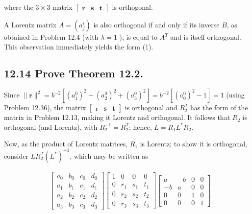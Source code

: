 \documentclass[10pt]{article}
\begin{document}
where the $3 \times 3$ matrix $\left[\begin{array}{lll}\mathbf{r} & \mathbf{s} & \mathbf{t}\end{array}\right]$ is orthogonal.

A Lorentz matrix $A=\left(a_{j}^{i}\right)$ is also orthogonal if and only if its inverse $B$, as obtained in Problem 12.4 (with $\lambda=1$ ), is equal to $A^{T}$ and is itself orthogonal. This observation immediately yields the form (1).

\subsection*{12.14 Prove Theorem 12.2.}
Since $\|\mathbf{r}\|^{2}=b^{-2}\left[\left(a_{1}^{0}\right)^{2}+\left(a_{2}^{0}\right)^{2}+\left(a_{3}^{0}\right)^{2}\right]=b^{-2}\left[\left(a_{0}^{0}\right)^{2}-1\right]=1$ (using Problem 12.36), the matrix $\left[\begin{array}{lll}\mathrm{r} & \mathbf{s} & \mathbf{t}\end{array}\right]$ is orthogonal and $R_{2}^{T}$ has the form of the matrix in Problem 12.13, making it Lorentz and orthogonal. It follows that $R_{2}$ is orthogonal (and Lorentz), with $R_{2}^{-1}=R_{2}^{T}$; hence, $L=R_{1} L^{*} R_{2}$.

Now, as the product of Lorentz matrices, $R_{1}$ is Lorentz; to show it is orthogonal, consider $L R_{2}^{T}\left(L^{*}\right)^{-1}$, which may be written as

$$
\begin{aligned}
& {\left[\begin{array}{llll}
a_{0} & b_{0} & c_{0} & d_{0} \\
a_{1} & b_{1} & c_{1} & d_{1} \\
a_{2} & b_{2} & c_{2} & d_{2} \\
a_{3} & b_{3} & c_{3} & d_{3}
\end{array}\right]\left[\begin{array}{llll}
1 & 0 & 0 & 0 \\
0 & r_{1} & s_{1} & t_{1} \\
0 & r_{2} & s_{2} & t_{2} \\
0 & r_{3} & s_{3} & t_{3}
\end{array}\right]\left[\begin{array}{rrrr}
a & -b & 0 & 0 \\
-b & a & 0 & 0 \\
0 & 0 & 1 & 0 \\
0 & 0 & 0 & 1
\end{array}\right]}
\end{aligned}
$$
\end{document}

